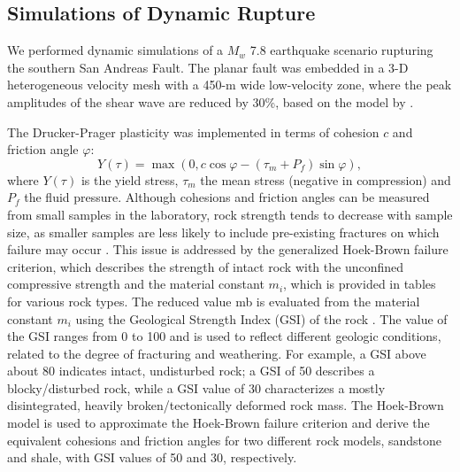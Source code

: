 \subsection{Simulations of Dynamic Rupture}
We performed dynamic simulations of a $M_w$ 7.8 earthquake scenario rupturing the southern San Andreas Fault. The planar fault was embedded in a 3-D heterogeneous velocity mesh \citep[SCEC CVM4;][]{magistraleSCECSouthernCalifornia2000} with a 450-m wide low-velocity zone, where the peak amplitudes of the shear wave are reduced by 30\%, based on the model by \citet{rotenOfffaultDeformationsShallow2017}.

The Drucker-Prager plasticity was implemented in terms of cohesion $c$ and friction angle $\varphi$:
\begin{equation}\label{eq:eks-1}
    Y(\tau)=\max \left(0, c \cos \varphi-\left(\tau_{m}+P_{f}\right) \sin \varphi\right),
\end{equation}
where $Y(\tau)$ is the yield stress, $\tau_{m}$ the mean stress (negative in compression) and $P_f$ the fluid pressure. Although cohesions and friction angles can be measured from small samples in the laboratory, rock strength tends to decrease with sample size, as smaller samples are less likely to include pre-existing fractures on which failure may occur \citep{wyllie2017rock}. This issue is addressed by the generalized Hoek-Brown failure criterion, which describes the strength of intact rock with the unconfined compressive strength and the material constant $m_i$, which is provided in tables for various rock types. The reduced value mb is evaluated from the material constant $m_i$ using the Geological Strength Index (GSI) of the rock \citep{hoek1980empirical,hoek1997practical}. The value of the GSI ranges from 0 to 100 and is used to reflect different geologic conditions, related to the degree of fracturing and weathering. For example, a GSI above about 80 indicates intact, undisturbed rock; a GSI of 50 describes a blocky/disturbed rock, while a GSI value of 30 characterizes a mostly disintegrated, heavily broken/tectonically deformed rock mass. The Hoek-Brown model \citep{evert2002hoek} is used to approximate the Hoek-Brown failure criterion and derive the equivalent cohesions and friction angles for two different rock models, sandstone and shale, with GSI values of 50 and 30, respectively.


